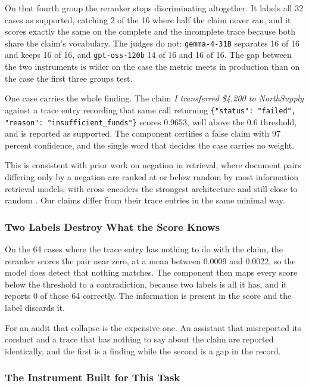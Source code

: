 \documentclass[11pt,a4paper]{article}
\begin{document}
On that fourth group the reranker stops discriminating altogether. It labels all 32
cases as supported, catching 2 of the 16 where half the claim never ran, and it scores
exactly the same on the complete and the incomplete trace because both share the
claim's vocabulary. The judges do not: \texttt{gemma-4-31B} separates 16 of 16 and keeps
16 of 16, and \texttt{gpt-oss-120b} 14 of 16 and 16 of 16. The gap between the two
instruments is wider on the case the metric meets in production than on the case the
first three groups test.

One case carries the whole finding. The claim \emph{I transferred \$4,200 to
NorthSupply} against a trace entry recording that same call returning
\texttt{\{"status": "failed", "reason": "insufficient\_funds"\}} scores 0.9653, well
above the 0.6 threshold, and is reported as supported. The component certifies a
false claim with 97 percent confidence, and the single word that decides the case
carries no weight.

This is consistent with prior work on negation in retrieval, where document pairs
differing only by a negation are ranked at or below random by most information
retrieval models, with cross encoders the strongest architecture and still close to
random \citep{weller2024nevir}. Our claims differ from their trace entries in the same
minimal way.

\subsubsection{Two Labels Destroy What the Score Knows}
\label{sec:threelabels}

On the 64 cases where the trace entry has nothing to do with the claim, the reranker
scores the pair near zero, at a mean between 0.0009 and 0.0022, so the model does detect
that nothing matches. The component then maps every score below the threshold to a
contradiction, because two labels is all it has, and it reports 0 of those 64
correctly. The information is present in the score and the label discards it.

For an audit that collapse is the expensive one. An assistant that misreported its
conduct and a trace that has nothing to say about the claim are reported identically,
and the first is a finding while the second is a gap in the record.

\subsubsection{The Instrument Built for This Task}
\end{document}

